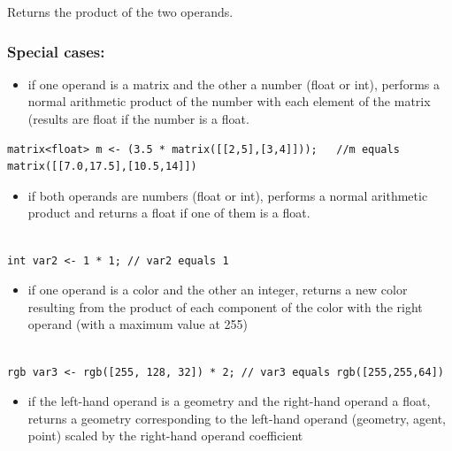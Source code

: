 \documentclass[]{book}
\providecommand{\tightlist}{%
  \setlength{\itemsep}{0pt}\setlength{\parskip}{0pt}}
\theoremstyle{definition}
\theoremstyle{definition}
\theoremstyle{definition}
\theoremstyle{remark}
\begin{document}
Returns the product of the two operands.

\subsubsection{Special cases:}\label{special-cases-6}

\begin{itemize}
\tightlist
\item
  if one operand is a matrix and the other a number (float or int),
  performs a normal arithmetic product of the number with each element
  of the matrix (results are float if the number is a float.
\end{itemize}

\begin{verbatim}
matrix<float> m <- (3.5 * matrix([[2,5],[3,4]]));   //m equals matrix([[7.0,17.5],[10.5,14]]) 
\end{verbatim}

\begin{itemize}
\tightlist
\item
  if both operands are numbers (float or int), performs a normal
  arithmetic product and returns a float if one of them is a float.
\end{itemize}

\begin{verbatim}
 
int var2 <- 1 * 1; // var2 equals 1
\end{verbatim}

\begin{itemize}
\tightlist
\item
  if one operand is a color and the other an integer, returns a new
  color resulting from the product of each component of the color with
  the right operand (with a maximum value at 255)
\end{itemize}

\begin{verbatim}
 
rgb var3 <- rgb([255, 128, 32]) * 2; // var3 equals rgb([255,255,64])
\end{verbatim}

\begin{itemize}
\tightlist
\item
  if the left-hand operand is a geometry and the right-hand operand a
  float, returns a geometry corresponding to the left-hand operand
  (geometry, agent, point) scaled by the right-hand operand coefficient
\end{itemize}
\end{document}
